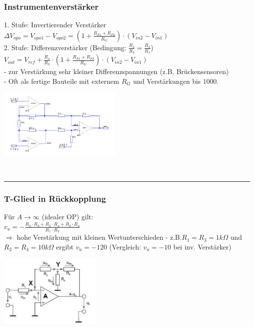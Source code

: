 		\begin{minipage}[c]{12cm}
		\subsubsection{Instrumentenverstärker}
			1. Stufe: Invertierender Verstärker \\
			$\Delta V_{opo}=V_{opo1}-V_{opo2}=(1+\frac{R_{F1}+R_{F2}}{R_G})\cdot(V_{in2}-V_{in1})$
			\smallskip \\
			2. Stufe: Differenzverstärker (Bedingung: $\frac{R_4}{R_3}=\frac{R_2}{R_1}$)\\
			$V_{out}=V_{ref}+\frac{R_4}{R_3}\cdot(1+\frac{R_{F1}+R_{F2}}{R_G})\cdot(V_{in2}-V_{in1})$
			\bigskip \\
			- zur Verstärkung sehr kleiner Differenzspannungen (z.B. Brückensensoren) \\
			- Oft als fertige Bauteile mit externem $R_G$ und Verstärkungen bis $1000$. \\
			\end{minipage}
			\begin{minipage}[c]{6cm}
          		\includegraphics[width=6cm]{./images/instramp.png} 
       	 	\end{minipage}\\
\hrule     
 	 
      	 \begin{minipage}[c]{12cm}	
       	 \subsubsection{T-Glied in Rückkopplung}
       	 	Für $A \to \infty$ (idealer OP) gilt: \smallskip \\
       	 	$v_u=-\frac{R_2 \cdot R_3 + R_2 \cdot R_4 + R_3 \cdot R_4}{R_1 \cdot R_3}$
       	 	\bigskip \\
       	 	$\Longrightarrow$ hohe Verstärkung mit kleinen Wertunterschieden - 
       	 	z.B.$R_1=R_3=1k\Omega$ und $R_2=R_4=10k\Omega$ ergibt $v_u=-120$ 
       	 	(Vergleich: $v_u=-10$ bei inv. Verstärker) \\
       	 \end{minipage}
       	 \begin{minipage}[c]{5cm}
       	 	\includegraphics[width=5cm]{./images/tglied.png}
       	 \end{minipage}      
 	 
